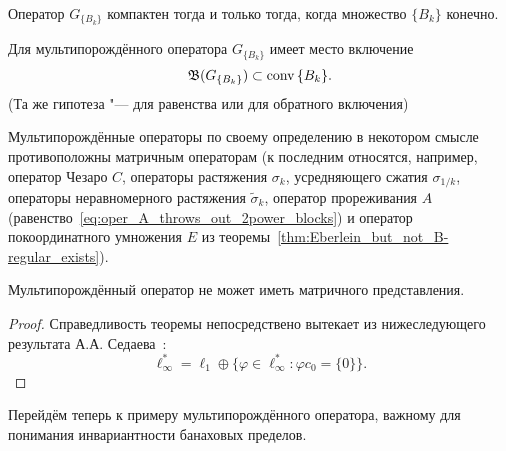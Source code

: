 \begin{hypothesis}
	Оператор $G_{\{B_k\}}$ компактен тогда и только тогда, когда множество ${\{B_k\}}$ конечно.
\end{hypothesis}

\begin{hypothesis}
	Для мультипорождённого оператора $G_{\{B_k\}}$ имеет место включение
	\begin{equation}
		\mathfrak{B} (G_{\{B_k\}}) \subset \operatorname{conv} {\{B_k\}}
		.
	\end{equation}
	(Та же гипотеза "--- для равенства или для обратного включения)
\end{hypothesis}

\begin{remark}
	Мультипорождённые операторы по своему определению в некотором смысле противоположны матричным операторам
	(к последним относятся, например, оператор Чезаро $C$, операторы растяжения $\sigma_k$, усредняющего сжатия $\sigma_{1/k}$,
	операторы неравномерного растяжения $\tilde\sigma_k$, оператор прореживания $A$ (равенство~\eqref{eq:oper_A_throws_out_2power_blocks}) и оператор покоординатного умножения $E$ из теоремы~\ref{thm:Eberlein_but_not_B-regular_exists}).
\end{remark}

\begin{theorem}
	Мультипорождённый оператор не может иметь матричного представления.
\end{theorem}

\begin{proof}
	Справедливость теоремы непосредствено вытекает из нижеследующего результата А.А. Седаева~\cite[\S 6.3]{sedaev2009_doc_vgasu}:
	\begin{equation}
		\ell_\infty^* = \ell_1 \oplus \{\varphi \in\ell_\infty^* : \varphi c_0 = \{0\}\}
		.
	\end{equation}
\end{proof}

Перейдём теперь к примеру мультипорождённого оператора, важному для понимания инвариантности банаховых пределов.

